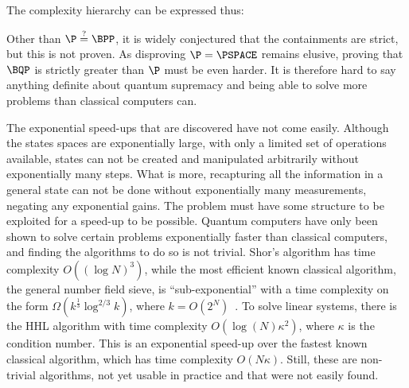 The complexity hierarchy can be expressed thus:
\begin{center}

\end{center}
Other than $\P \stackrel{?}{=} \BPP$, it is widely conjectured that the containments are strict, but this is not proven.
As disproving $\P = \PSPACE$ remains elusive, proving that $\BQP$ is strictly greater than $\P$ must be even harder.
It is therefore hard to say anything definite about quantum supremacy and being able to solve more problems than classical computers can.

The exponential speed-ups that are discovered have not come easily.
Although the states spaces are exponentially large, with only a limited set of operations available, states can not be created and manipulated arbitrarily without exponentially many steps.
What is more, recapturing all the information in a general state can not be done without exponentially many measurements, negating any exponential gains.
The problem must have some structure to be exploited for a speed-up to be possible.
Quantum computers have only been shown to solve certain problems exponentially faster than classical computers, and finding the algorithms to do so is not trivial.
Shor's algorithm has time complexity $O((\log N)^3)$, while the most efficient known classical algorithm, the general number field sieve, is \enquote{sub-exponential} with a time complexity on the form $\Omega(k^{\frac{1}{3}}\log^{2/3}k)$, where $k=O(2^N)$~\autocite{dervovic2018}.
To solve linear systems, there is the HHL algorithm with time complexity $O(\log(N)\kappa^2)$, where $\kappa$ is the condition number.
This is an exponential speed-up over the fastest known classical algorithm\footnotemark{}, which has time complexity $O(N \kappa)$.
Still, these are non-trivial algorithms, not yet usable in practice and that were not easily found.

